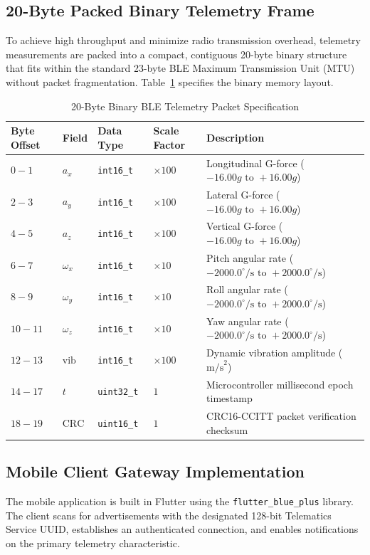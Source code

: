 \subsection{20-Byte Packed Binary Telemetry Frame}
To achieve high throughput and minimize radio transmission overhead, telemetry measurements are packed into a compact, contiguous 20-byte binary structure that fits within the standard 23-byte BLE Maximum Transmission Unit (MTU) without packet fragmentation. Table~\ref{tab:ble_packet} specifies the binary memory layout.

\begin{table}[H]
\centering
\small
\caption{20-Byte Binary BLE Telemetry Packet Specification}
\label{tab:ble_packet}
\begin{tabularx}{\textwidth}{llllX}
\toprule
\textbf{Byte Offset} & \textbf{Field} & \textbf{Data Type} & \textbf{Scale Factor} & \textbf{Description} \\
\midrule
$0 - 1$ & $a_x$ & \texttt{int16\_t} & $\times 100$ & Longitudinal G-force ($-16.00g \text{ to } +16.00g$) \\
$2 - 3$ & $a_y$ & \texttt{int16\_t} & $\times 100$ & Lateral G-force ($-16.00g \text{ to } +16.00g$) \\
$4 - 5$ & $a_z$ & \texttt{int16\_t} & $\times 100$ & Vertical G-force ($-16.00g \text{ to } +16.00g$) \\
$6 - 7$ & $\omega_x$ & \texttt{int16\_t} & $\times 10$ & Pitch angular rate ($-2000.0^\circ/\text{s} \text{ to } +2000.0^\circ/\text{s}$) \\
$8 - 9$ & $\omega_y$ & \texttt{int16\_t} & $\times 10$ & Roll angular rate ($-2000.0^\circ/\text{s} \text{ to } +2000.0^\circ/\text{s}$) \\
$10 - 11$ & $\omega_z$ & \texttt{int16\_t} & $\times 10$ & Yaw angular rate ($-2000.0^\circ/\text{s} \text{ to } +2000.0^\circ/\text{s}$) \\
$12 - 13$ & $\text{vib}$ & \texttt{int16\_t} & $\times 100$ & Dynamic vibration amplitude ($\text{m/s}^2$) \\
$14 - 17$ & $t$ & \texttt{uint32\_t} & $1$ & Microcontroller millisecond epoch timestamp \\
$18 - 19$ & $\text{CRC}$ & \texttt{uint16\_t} & $1$ & CRC16-CCITT packet verification checksum \\
\bottomrule
\end{tabularx}
\end{table}

\subsection{Mobile Client Gateway Implementation}
The mobile application is built in Flutter using the \texttt{flutter\_blue\_plus} library. The client scans for advertisements with the designated 128-bit Telematics Service UUID, establishes an authenticated connection, and enables notifications on the primary telemetry characteristic. 

